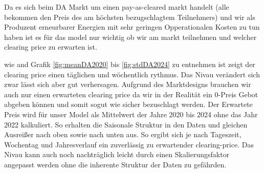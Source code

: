 Da es sich beim DA Markt um einen pay-as-cleared markt handelt (alle bekommen den Preis des am höchsten bezugschlagtem Teilnehmers)
und wir als Produzent erneurbarer Energien mit sehr geringen Opperationalen Kosten zu tun haben ist es für das model nur wichtig ob
wir am markt teilnehmen und welcher clearing price zu erwarten ist.

wie and Grafik \ref{fig:meanDA2020} bis \ref{fig:stdDA2024}      zu entnehmen ist zeigt der clearing price einen täglichen und wöchentlich  rythmus.
Das Nivau verändert sich zwar lässt sich aber gut verhersagen. Aufgrund des Marktdesigns brauchen wir auch nur einen erwarteten clearing price
da wir in der Realität ein 0-Preis Gebot abgeben können und somit sogut wie sicher bezuschlagt werden.
Der Erwartete Preis wird für unser Model als Mittelwert der Jahre 2020 bis 2024 ohne das Jahr 2022 kalkuliert. So erhalten die
Saisonale Struktur in den Daten und gleichen Ausreißer nach oben sowie nach unten aus. So ergibt sich je nach Tageszeit, Wochentag und Jahresverlauf ein zuverlässig
zu erwartender clearing-price. Das Nivau kann auch noch nachträglich leicht durch einen Skalierungsfaktor angepasst werden ohne die inherente Struktur der Daten zu gefährden.

